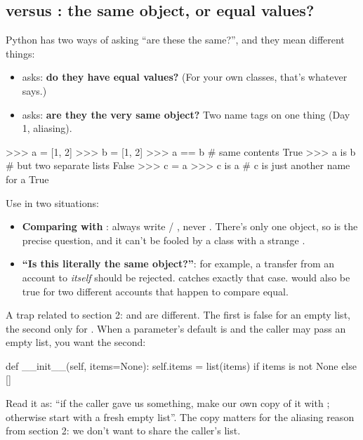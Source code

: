 \documentclass[10pt,a4paper]{article}
\begin{document}
\subsection{ versus \code{=\allowbreak{}=\allowbreak{}}: the same object, or equal values?}
Python has two ways of asking “are these the same?”, and they mean different things:
\begin{itemize}
\item {} asks: \textbf{do they have equal values?} (For your own classes, that’s whatever  says.)
\item {} asks: \textbf{are they the very same object?} Two name tags on one thing (Day 1, aliasing).
\end{itemize}
\begin{txtcode}
>>> a = [1, 2]
>>> b = [1, 2]
>>> a == b          # same contents
True
>>> a is b          # but two separate lists
False
>>> c = a
>>> c is a          # c is just another name for a
True
\end{txtcode}
Use  in two situations:
\begin{itemize}
\item \textbf{Comparing with }: always write  / , never . There’s only one  object, so  is the precise question, and it can’t be fooled by a class with a strange .
\item \textbf{“Is this literally the same object?”}: for example, a transfer from an account to \emph{itself} should be rejected.  catches exactly that case.  would also be true for two different accounts that happen to compare equal.
\end{itemize}
A trap related to section 2:  and  are different. The first is false for an empty list, the second only for . When a parameter’s default is  and the caller may pass an empty list, you want the second:
\begin{pycode}
def __init__(self, items=None):
    self.items = list(items) if items is not None else []
\end{pycode}
Read it as: “if the caller gave us something, make our own copy of it with ; otherwise start with a fresh empty list”. The copy matters for the aliasing reason from section 2: we don’t want to share the caller’s list.
\end{document}
